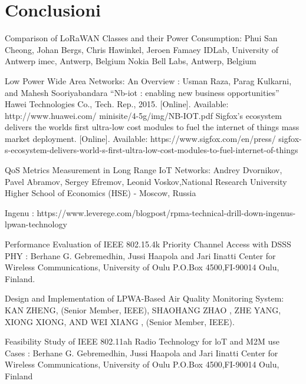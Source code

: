 \documentclass[12pt,a4paper,openright,twoside]{report}
\begin{document}
\chapter{Conclusioni}






\begin{thebibliography}{90}             %
\rhead[\fancyplain{}{\bfseries \leftmark}]{\fancyplain{}{\bfseries
\thepage}}
 Comparison of LoRaWAN Classes and their Power Consumption: Phui San Cheong, Johan Bergs, Chris Hawinkel, Jeroen Famaey IDLab, University of Antwerp imec, Antwerp, Belgium Nokia Bell Labs, Antwerp, Belgium


 Low Power Wide Area Networks: An Overview : Usman Raza, Parag Kulkarni, and Mahesh Sooriyabandara
 ``Nb-iot : enabling new business opportunities'' Hawei Technologies
Co., Tech. Rep., 2015. [Online]. Available: http://www.huawei.com/
minisite/4-5g/img/NB-IOT.pdf
 Sigfox's ecosystem delivers the worlds first ultra-low cost
modules to fuel the internet of things mass market
deployment. [Online]. Available: https://www.sigfox.com/en/press/
sigfox-s-ecosystem-delivers-world-s-first-ultra-low-cost-modules-to-fuel-internet-of-things

 QoS Metrics Measurement in Long Range IoT Networks: Andrey Dvornikov, Pavel Abramov, Sergey Efremov, Leonid Voskov,National Research University Higher School of Economics (HSE) - Moscow, Russia 

 Ingenu : https://www.leverege.com/blogpost/rpma-technical-drill-down-ingenus-lpwan-technology

 Performance Evaluation of IEEE 802.15.4k Priority Channel Access with DSSS PHY : Berhane G. Gebremedhin, Jussi Haapola and Jari Iinatti Center for Wireless Communications, University of Oulu P.O.Box 4500,FI-90014 Oulu, Finland.

 Design and Implementation of LPWA-Based Air Quality Monitoring System: KAN ZHENG, (Senior Member, IEEE), SHAOHANG ZHAO , ZHE YANG, XIONG XIONG, AND WEI XIANG , (Senior Member, IEEE).

 Feasibility Study of IEEE 802.11ah Radio Technology for loT and M2M use Cases : Berhane G. Gebremedhin, Jussi Haapola and Jari Iinatti Center for Wireless Communications, University of Oulu P.O.Box 4500,FI-90014 Oulu, Finland


\end{thebibliography}
\end{document}
